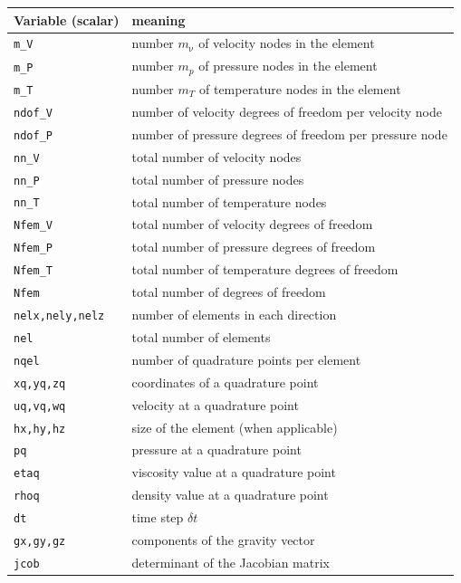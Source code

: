 \documentclass[a4paper,11pt]{report}
\begin{document}
\begin{tabular}{p{3.5cm}p{12cm}}
\hline
Variable (scalar) & meaning \\
\hline
\hline
{\tt m\_V}    & number $m_\upnu$ of velocity nodes in the element \\
{\tt m\_P}     & number $m_p$ of pressure nodes in the element \\
{\tt m\_T}     & number $m_T$ of temperature nodes in the element \\
{\tt ndof\_V}  & number of velocity degrees of freedom per velocity node \\
{\tt ndof\_P}  & number of pressure degrees of freedom per pressure node \\
{\tt nn\_V}    & total number of velocity nodes \\
{\tt nn\_P}    & total number of pressure nodes \\
{\tt nn\_T}    & total number of temperature nodes \\
{\tt Nfem\_V}  & total number of velocity degrees of freedom \\
{\tt Nfem\_P}  & total number of pressure degrees of freedom \\
{\tt Nfem\_T}  & total number of temperature degrees of freedom \\
{\tt Nfem}     & total number of degrees of freedom \\
{\tt nelx,nely,nelz} & number of elements in each direction \\
{\tt nel}      & total number of elements \\
{\tt nqel}     & number of quadrature points per element \\
{\tt xq,yq,zq} & coordinates of a quadrature point \\
{\tt uq,vq,wq} & velocity at a quadrature point \\
{\tt hx,hy,hz} & size of the element (when applicable)\\ 
{\tt pq}       & pressure at a quadrature point \\
{\tt etaq}     & viscosity value at a quadrature point \\
{\tt rhoq}     & density value at a quadrature point \\
{\tt dt}       & time step $\delta t$\\ 
{\tt gx,gy,gz} & components of the gravity vector \\
{\tt jcob}     & determinant of the Jacobian matrix \\
\hline
\end{tabular}
\end{document}
